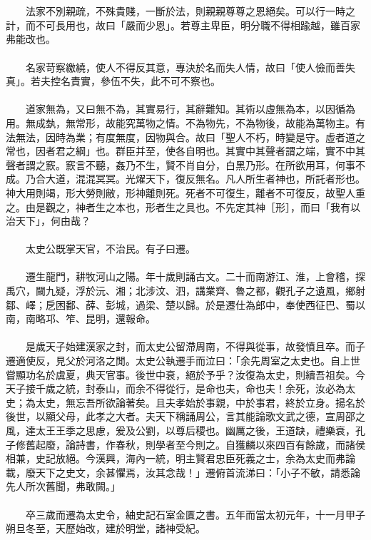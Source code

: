 \\\\
　　法家不別親疏，不殊貴賤，一斷於法，則親親尊尊之恩絕矣。可以行一時之計，而不可長用也，故曰「嚴而少恩」。若尊主卑臣，明分職不得相踰越，雖百家弗能改也。
\\\\
　　名家苛察繳繞，使人不得反其意，專決於名而失人情，故曰「使人儉而善失真」。若夫控名責實，參伍不失，此不可不察也。
\\\\
　　道家無為，又曰無不為，其實易行，其辭難知。其術以虛無為本，以因循為用。無成埶，無常形，故能究萬物之情。不為物先，不為物後，故能為萬物主。有法無法，因時為業；有度無度，因物與合。故曰「聖人不朽，時變是守。虛者道之常也，因者君之綱」也。群臣并至，使各自明也。其實中其聲者謂之端，實不中其聲者謂之窾。窾言不聽，姦乃不生，賢不肖自分，白黑乃形。在所欲用耳，何事不成。乃合大道，混混冥冥。光燿天下，復反無名。凡人所生者神也，所託者形也。神大用則竭，形大勞則敝，形神離則死。死者不可復生，離者不可復反，故聖人重之。由是觀之，神者生之本也，形者生之具也。不先定其神［形］，而曰「我有以治天下」，何由哉？
\\\\
　　太史公既掌天官，不治民。有子曰遷。
\\\\
　　遷生龍門，耕牧河山之陽。年十歲則誦古文。二十而南游江、淮，上會稽，探禹穴，闚九疑，浮於沅、湘；北涉汶、泗，講業齊、魯之都，觀孔子之遺風，鄉射鄒、嶧；戹困鄱、薛、彭城，過梁、楚以歸。於是遷仕為郎中，奉使西征巴、蜀以南，南略邛、笮、昆明，還報命。
\\\\
　　是歲天子始建漢家之封，而太史公留滯周南，不得與從事，故發憤且卒。而子遷適使反，見父於河洛之閒。太史公執遷手而泣曰：「余先周室之太史也。自上世嘗顯功名於虞夏，典天官事。後世中衰，絕於予乎？汝復為太史，則續吾祖矣。今天子接千歲之統，封泰山，而余不得從行，是命也夫，命也夫！余死，汝必為太史；為太史，無忘吾所欲論著矣。且夫孝始於事親，中於事君，終於立身。揚名於後世，以顯父母，此孝之大者。夫天下稱誦周公，言其能論歌文武之德，宣周邵之風，達太王王季之思慮，爰及公劉，以尊后稷也。幽厲之後，王道缺，禮樂衰，孔子修舊起廢，論詩書，作春秋，則學者至今則之。自獲麟以來四百有餘歲，而諸侯相兼，史記放絕。今漢興，海內一統，明主賢君忠臣死義之士，余為太史而弗論載，廢天下之史文，余甚懼焉，汝其念哉！」遷俯首流涕曰：「小子不敏，請悉論先人所次舊聞，弗敢闕。」
\\\\
　　卒三歲而遷為太史令，紬史記石室金匱之書。五年而當太初元年，十一月甲子朔旦冬至，天歷始改，建於明堂，諸神受紀。
\\\\
